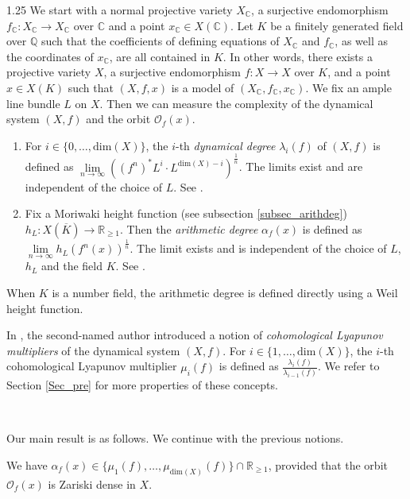 \documentclass[12pt]{amsart}
\newcommand{\mb}[1]{\mathbb{#1}}
\newcommand\ra{\rightarrow}
\begin{document}
\begin{spacing}{1.25}
We start with a normal projective variety $X_{\mathbb{C}}$, a surjective endomorphism $f_{\mb{C}}:X_{\mathbb{C}}\ra X_{\mathbb{C}}$ over $\mathbb{C}$ and a point $x_{\mb{C}}\in X(\mb{C})$. Let $K$ be a finitely generated field over $\mathbb{Q}$ such that the coefficients of defining equations of $X_{\mathbb{C}}$ and $f_{\mb{C}}$, as well as the coordinates of $x_{\mb{C}}$, are all contained in $K$. In other words, there exists a projective variety $X$, a surjective endomorphism $f: X\ra X$ over $K$, and a point $x\in X(K)$ such that $(X,f,x)$ is a model of $(X_{\mathbb{C}},f_{\mb{C}}, x_{\mb{C}})$. We fix an ample line bundle $L$ on $X$. Then we can measure the complexity of the dynamical system $(X,f)$ and the orbit $\mathcal{O}_f(x)$.
\begin{enumerate}
\item
For $i\in\{0,\dots,\mathrm{dim}(X)\}$, the $i$-th \emph{dynamical degree} $\lambda_i(f)$ of $(X,f)$ is defined as $\lim\limits_{n\rightarrow\infty}((f^n)^{*}L^i\cdot L^{\mathrm{dim}(X)-i})^{\frac{1}{n}}$. The limits exist and are independent of the choice of $L$. See \cite{DS05,Dan20,Tru20}.

\item
Fix a Moriwaki height function (see subsection \ref{subsec_arithdeg}) $h_{L}:X(\overline{K})\rightarrow\mathbb{R}_{\geq1}$. Then the \emph{arithmetic degree} $\alpha_f(x)$ is defined as $\lim\limits_{n\rightarrow\infty}h_{L}(f^n(x))^{\frac{1}{n}}$. The limit exists and is independent of the choice of $L$, $h_L$ and the field $K$. See \cite{KS16,Oh22,LS24}.
\end{enumerate}

\begin{remark}
When $K$ is a number field, the arithmetic degree is defined directly using a Weil height function.
\end{remark}

In \cite{xie24}, the second-named author introduced a notion of \emph{cohomological Lyapunov multipliers} of the dynamical system $(X,f)$. For $i\in\{1,\dots,\mathrm{dim}(X)\}$, the $i$-th cohomological Lyapunov multiplier $\mu_i(f)$ is defined as $\frac{\lambda_i(f)}{\lambda_{i-1}(f)}$. We refer to Section \ref{Sec_pre} for more properties of these concepts.

\ 

Our main result is as follows. We continue with the previous notions.


\begin{theorem}\label{Thm_main}
We have $\alpha_f(x)\in\{\mu_1(f),\dots,\mu_{\mathrm{dim}(X)}(f)\}\cap\mathbb{R}_{\geq1}$, provided that the orbit $\mathcal{O}_f(x)$ is Zariski dense in $X$.
\end{theorem}



\end{spacing}
\end{document}
